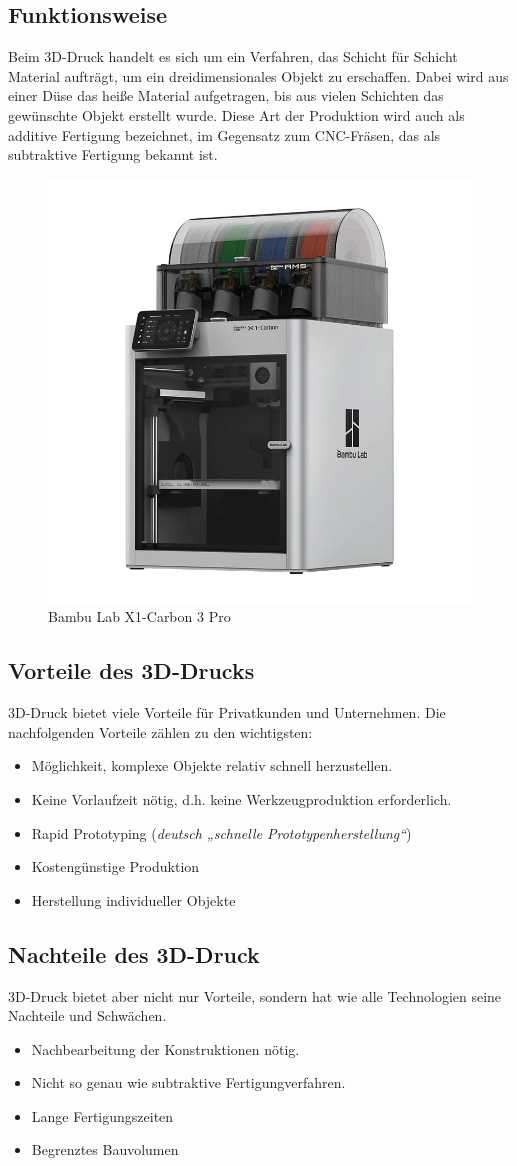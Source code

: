 \subsection{Funktionsweise}
Beim 3D-Druck handelt es sich um ein Verfahren, das Schicht für Schicht Material aufträgt, um ein dreidimensionales Objekt zu erschaffen. Dabei wird aus einer Düse das heiße Material aufgetragen, bis aus vielen Schichten das gewünschte Objekt erstellt wurde. Diese Art der Produktion wird auch als additive Fertigung bezeichnet, im Gegensatz zum CNC-Fräsen, das als subtraktive Fertigung bekannt ist.


\begin{figure}[H]
	\centering
	\includegraphics[width=0.5\linewidth]{images/3D-Drucker.png}
	\caption[Bambu Lab X1-Carbon 3 Pro]{Bambu Lab X1-Carbon 3 Pro}
	\label{fig:3D-Druck}
\end{figure}


\subsection{Vorteile des 3D-Drucks}
3D-Druck bietet viele Vorteile für Privatkunden und Unternehmen. Die nachfolgenden Vorteile zählen zu den wichtigsten:
\begin{itemize}
	\item Möglichkeit, komplexe Objekte relativ schnell herzustellen.
	\item Keine Vorlaufzeit nötig, d.h. keine Werkzeugproduktion erforderlich.
	\item Rapid Prototyping (\textit{deutsch „schnelle Prototypenherstellung“})
	\item Kostengünstige Produktion
	\item Herstellung individueller Objekte
\end{itemize} \parencite{3DDruckVorteile}

\subsection{Nachteile des 3D-Druck}
3D-Druck bietet aber nicht nur Vorteile, sondern hat wie alle Technologien seine Nachteile und Schwächen.
\begin{itemize}
	\item Nachbearbeitung der Konstruktionen nötig.
	\item Nicht so genau wie subtraktive Fertigungverfahren.
	\item Lange Fertigungszeiten
	\item Begrenztes Bauvolumen
\end{itemize}
\parencite{3DDruckNachteile}


